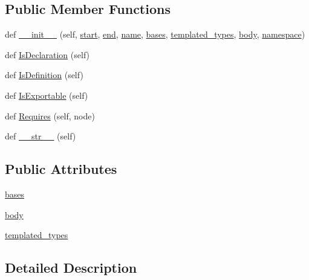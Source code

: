 \subsection*{Public Member Functions}
\begin{DoxyCompactItemize}
\item 
def \hyperlink{classcpp_1_1ast_1_1Class_acc17c34512d5cc54d5125734ce79f219}{\+\_\+\+\_\+init\+\_\+\+\_\+} (self, \hyperlink{classcpp_1_1ast_1_1Node_a7b2aa97e6a049bb1a93aea48c48f1f44}{start}, \hyperlink{classcpp_1_1ast_1_1Node_a3c5e5246ccf619df28eca02e29d69647}{end}, \hyperlink{classcpp_1_1ast_1_1__GenericDeclaration_af774f4729dfd78d0538a6782fe8514c1}{name}, \hyperlink{classcpp_1_1ast_1_1Class_a5665eb67314a075d4e0ff91accbde5d1}{bases}, \hyperlink{classcpp_1_1ast_1_1Class_a48ed0d3115656554d9134bc1787390fa}{templated\+\_\+types}, \hyperlink{classcpp_1_1ast_1_1Class_add39f61fdcf6dae42d79cac3dcbb7782}{body}, \hyperlink{classcpp_1_1ast_1_1__GenericDeclaration_a8aee3f11b37449d54b42a78e0a689f46}{namespace})
\item 
def \hyperlink{classcpp_1_1ast_1_1Class_a4758bfb7c00410575932974e1ed8b7da}{Is\+Declaration} (self)
\item 
def \hyperlink{classcpp_1_1ast_1_1Class_ae6d2356f835d06d5109d9e4609d86780}{Is\+Definition} (self)
\item 
def \hyperlink{classcpp_1_1ast_1_1Class_a1ab749f8cfddb0903c6484791f70f42e}{Is\+Exportable} (self)
\item 
def \hyperlink{classcpp_1_1ast_1_1Class_a347673e0a2a7b840b7d2d1cae13977f7}{Requires} (self, node)
\item 
def \hyperlink{classcpp_1_1ast_1_1Class_a0a63f6fab75d61ffac6fb9f1c29ae84d}{\+\_\+\+\_\+str\+\_\+\+\_\+} (self)
\end{DoxyCompactItemize}
\subsection*{Public Attributes}
\begin{DoxyCompactItemize}
\item 
\hyperlink{classcpp_1_1ast_1_1Class_a5665eb67314a075d4e0ff91accbde5d1}{bases}
\item 
\hyperlink{classcpp_1_1ast_1_1Class_add39f61fdcf6dae42d79cac3dcbb7782}{body}
\item 
\hyperlink{classcpp_1_1ast_1_1Class_a48ed0d3115656554d9134bc1787390fa}{templated\+\_\+types}
\end{DoxyCompactItemize}


\subsection{Detailed Description}


